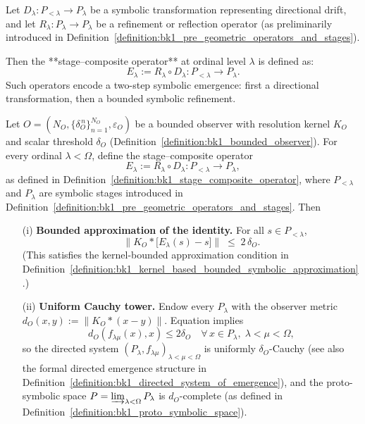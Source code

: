\begin{definition}
\label{definition:bk1_stage_composite_operator}
Let \(D_\lambda : P_{<\lambda} \to P_\lambda\) be a symbolic transformation representing directional drift, and let \(R_\lambda : P_\lambda \to P_\lambda\) be a refinement or reflection operator  
(as preliminarily introduced in Definition~\ref{definition:bk1_pre_geometric_operators_and_stages}).

Then the **stage–composite operator** at ordinal level \(\lambda\) is defined as:
\[
E_\lambda := R_\lambda \circ D_\lambda : P_{<\lambda} \to P_\lambda.
\]
Such operators encode a two-step symbolic emergence: first a directional transformation, then a bounded symbolic refinement.
\end{definition}
\begin{lemma}
\label{lemma:bk1_observer_bounded_emergence_constraint}
Let 
\(
O=(N_O,\{\delta^{\,n}_{O}\}_{n=1}^{N_O},\varepsilon_O)
\)
be a bounded observer with resolution kernel \(K_O\) and scalar threshold \(\delta_O\) (Definition~\ref{definition:bk1_bounded_observer}).  
For every ordinal \(\lambda<\Omega\), define the stage–composite operator  
\[
  E_\lambda := R_\lambda \circ D_\lambda : P_{<\lambda} \longrightarrow P_\lambda,
\]
as defined in Definition~\ref{definition:bk1_stage_composite_operator},  
where \(P_{<\lambda}\) and \(P_\lambda\) are symbolic stages introduced in Definition~\ref{definition:bk1_pre_geometric_operators_and_stages}.  
Then
\begin{enumerate}
  \item[\textup{(i)}]  \textbf{Bounded approximation of the identity.}\; 
        For all \(s\in P_{<\lambda}\),
        \begin{equation}
          \bigl\lVert K_O * \bigl[E_\lambda(s) - s\bigr] \bigr\rVert 
          \;\le\; 2\,\delta_O.
        \end{equation}
        (This satisfies the kernel-bounded approximation condition in Definition~\ref{definition:bk1_kernel_based_bounded_symbolic_approximation}.)

  \item[\textup{(ii)}]  \textbf{Uniform Cauchy tower.}\;
        Endow every \(P_\lambda\) with the observer metric
        \(
          d_O(x,y) := \lVert K_O * (x - y) \rVert.
        \)
        Equation implies
        \[
          d_O(f_{\lambda\mu}(x), x) \le 2\delta_O
          \quad
          \forall\,x \in P_\lambda,\;
          \lambda < \mu < \Omega,
        \]
        so the directed system
        \(
          (P_\lambda, f_{\lambda\mu})_{\lambda<\mu<\Omega}
        \)
        is uniformly \(\delta_O\)-Cauchy  
        (see also the formal directed emergence structure in Definition~\ref{definition:bk1_directed_system_of_emergence}),  
        and the proto-symbolic space
        \(
          P = \varinjlim_{\lambda<\Omega} P_\lambda
        \)
        is \(d_O\)-complete (as defined in Definition~\ref{definition:bk1_proto_symbolic_space}).
\end{enumerate}
\end{lemma}
